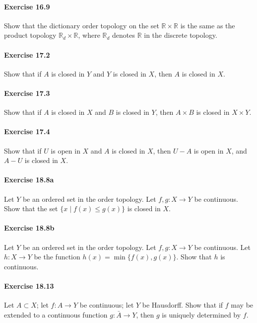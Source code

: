 \documentclass{article}
\begin{document}
\paragraph{Exercise 16.9} Show that the dictionary order topology on the set $\mathbb{R} \times \mathbb{R}$ is the same as the product topology $\mathbb{R}_d \times \mathbb{R}$, where $\mathbb{R}_d$ denotes $\mathbb{R}$ in the discrete topology.

\paragraph{Exercise 17.2} Show that if $A$ is closed in $Y$ and $Y$ is closed in $X$, then $A$ is closed in $X$.

\paragraph{Exercise 17.3} Show that if $A$ is closed in $X$ and $B$ is closed in $Y$, then $A \times B$ is closed in $X \times Y$.

\paragraph{Exercise 17.4} Show that if $U$ is open in $X$ and $A$ is closed in $X$, then $U-A$ is open in $X$, and $A-U$ is closed in $X$.

\paragraph{Exercise 18.8a} Let $Y$ be an ordered set in the order topology. Let $f, g: X \rightarrow Y$ be continuous. Show that the set $\{x \mid f(x) \leq g(x)\}$ is closed in $X$.

\paragraph{Exercise 18.8b} Let $Y$ be an ordered set in the order topology. Let $f, g: X \rightarrow Y$ be continuous. Let $h: X \rightarrow Y$ be the function $h(x)=\min \{f(x), g(x)\}.$ Show that $h$ is continuous.

\paragraph{Exercise 18.13} Let $A \subset X$; let $f: A \rightarrow Y$ be continuous; let $Y$ be Hausdorff. Show that if $f$ may be extended to a continuous function $g: \bar{A} \rightarrow Y$, then $g$ is uniquely determined by $f$.
\end{document}
